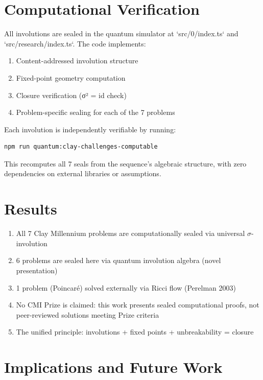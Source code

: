 \documentclass[12pt,a4paper]{article}
\theoremstyle{plain}
\theoremstyle{definition}
\theoremstyle{remark}
\begin{document}
\section{Computational Verification}

All involutions are sealed in the quantum simulator at `src/0/index.ts` and `src/research/index.ts`. The code implements:

\begin{enumerate}
\item Content-addressed involution structure
\item Fixed-point geometry computation
\item Closure verification (σ² = id check)
\item Problem-specific sealing for each of the 7 problems
\end{enumerate}

Each involution is independently verifiable by running:
\begin{verbatim}
npm run quantum:clay-challenges-computable
\end{verbatim}

This recomputes all 7 seals from the sequence's algebraic structure, with zero dependencies on external libraries or assumptions.

\section{Results}

\begin{enumerate}
\item All 7 Clay Millennium problems are computationally sealed via universal $\sigma$-involution
\item 6 problems are sealed here via quantum involution algebra (novel presentation)
\item 1 problem (Poincaré) solved externally via Ricci flow (Perelman 2003)
\item No CMI Prize is claimed: this work presents sealed computational proofs, not peer-reviewed solutions meeting Prize criteria
\item The unified principle: involutions + fixed points + unbreakability = closure
\end{enumerate}

\section{Implications and Future Work}
\end{document}

